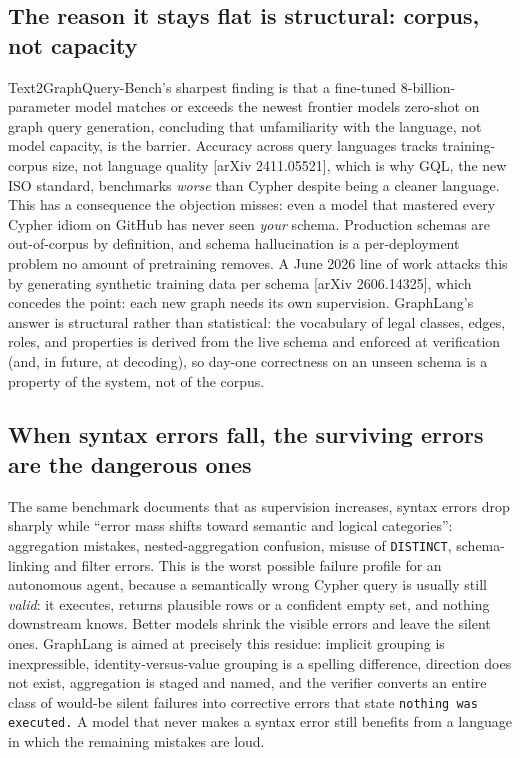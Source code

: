 \documentclass[11pt]{article}
\begin{document}
\subsection{The reason it stays flat is structural: corpus, not capacity}

Text2GraphQuery-Bench's sharpest finding is that a fine-tuned 8-billion-parameter model matches or exceeds the newest frontier models zero-shot on graph query generation, concluding that unfamiliarity with the language, not model capacity, is the barrier. Accuracy across query languages tracks training-corpus size, not language quality [arXiv 2411.05521], which is why GQL, the new ISO standard, benchmarks \emph{worse} than Cypher despite being a cleaner language. This has a consequence the objection misses: even a model that mastered every Cypher idiom on GitHub has never seen \emph{your} schema. Production schemas are out-of-corpus by definition, and schema hallucination is a per-deployment problem no amount of pretraining removes. A June 2026 line of work attacks this by generating synthetic training data per schema [arXiv 2606.14325], which concedes the point: each new graph needs its own supervision. GraphLang's answer is structural rather than statistical: the vocabulary of legal classes, edges, roles, and properties is derived from the live schema and enforced at verification (and, in future, at decoding), so day-one correctness on an unseen schema is a property of the system, not of the corpus.

\subsection{When syntax errors fall, the surviving errors are the dangerous ones}

The same benchmark documents that as supervision increases, syntax errors drop sharply while ``error mass shifts toward semantic and logical categories'': aggregation mistakes, nested-aggregation confusion, misuse of \texttt{DISTINCT}, schema-linking and filter errors. This is the worst possible failure profile for an autonomous agent, because a semantically wrong Cypher query is usually still \emph{valid}: it executes, returns plausible rows or a confident empty set, and nothing downstream knows. Better models shrink the visible errors and leave the silent ones. GraphLang is aimed at precisely this residue: implicit grouping is inexpressible, identity-versus-value grouping is a spelling difference, direction does not exist, aggregation is staged and named, and the verifier converts an entire class of would-be silent failures into corrective errors that state \texttt{nothing was executed.} A model that never makes a syntax error still benefits from a language in which the remaining mistakes are loud.
\end{document}
